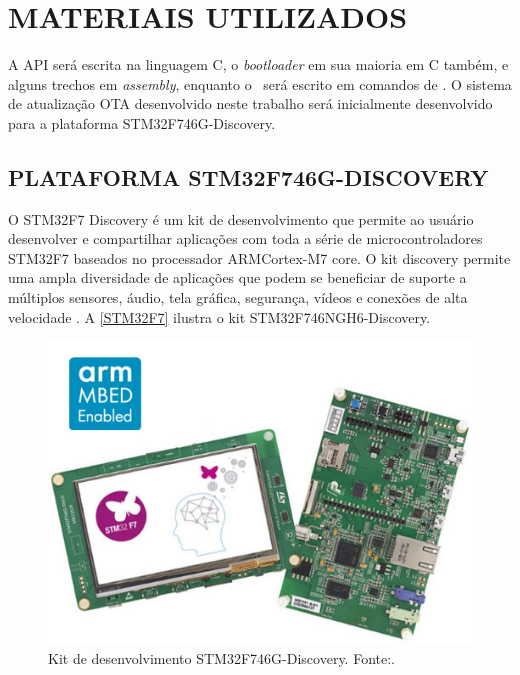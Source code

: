 \section{MATERIAIS UTILIZADOS}

A API será escrita na linguagem C, o \textit{bootloader} em sua maioria em C também, e alguns trechos em \textit{assembly}, enquanto o \linker\ será escrito em comandos de \linker. O sistema de atualização OTA desenvolvido neste trabalho será inicialmente desenvolvido para a plataforma STM32F746G-Discovery.

\subsection{PLATAFORMA STM32F746G-DISCOVERY}

O STM32F7 Discovery é um kit de desenvolvimento que permite ao usuário desenvolver e compartilhar aplicações com toda a série de microcontroladores STM32F7 baseados no processador ARM\textregistered  Cortex\textregistered-M7 core.
O kit discovery permite uma ampla diversidade de aplicações que podem se beneficiar de suporte a múltiplos sensores, áudio, tela gráfica, segurança, vídeos e conexões de alta velocidade \cite{STM32F7}.
A \autoref{STM32F7} ilustra o kit STM32F746NGH6-Discovery.

\begin{figure}[H]
    \scriptsize
     \centering
     \includegraphics[scale=0.4]{dados/figuras/STM32F7.jpg}
     \caption{Kit de desenvolvimento STM32F746G-Discovery. \newline Fonte:\cite{STM32F7}.}
     \label{STM32F7}
\end{figure}

